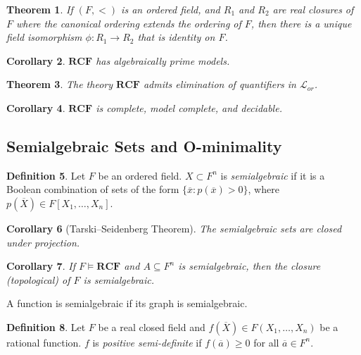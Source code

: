 \documentclass{amsart}
\newtheorem{theorem}{Theorem}[subsection]
\newtheorem{corollary}[theorem]{Corollary}
\theoremstyle{definition}
\newtheorem{definition}[theorem]{Definition}
\numberwithin{equation}{section}
\begin{document}
\begin{theorem}
    If $(F,<)$ is an ordered field,
    and $R_1$ and $R_2$ are real closures of $F$ where the canonical ordering extends the ordering of $F$,
    then there is a unique field isomorphism $\phi: R_1 \to R_2$ that is identity on $F$.
\end{theorem}

\begin{corollary}
    $\mathbf{RCF}$ has algebraically prime models.
\end{corollary}

\begin{theorem}
    The theory $\mathbf{RCF}$ admits elimination of quantifiers in $\mathcal{L}_{or}$.
\end{theorem}

\begin{corollary}
    $\mathbf{RCF}$ is complete, model complete, and decidable.
\end{corollary}

\subsection{Semialgebraic Sets and O-minimality}
\begin{definition}
    Let $F$ be an ordered field.
    $X \subset F^n$ is \emph{semialgebraic} if it is a Boolean combination of sets of the form $\{\overline{x}:p(\overline{x})>0\}$,
    where $p(\overline{X}) \in F[X_1,\dots,X_n]$.
\end{definition}

\begin{corollary}[Tarski--Seidenberg Theorem]
    The semialgebraic sets are closed under projection.
\end{corollary}

\begin{corollary}
    If $F \models \mathbf{RCF}$ and $A \subseteq F^n$ is semialgebraic,
    then the closure (topological) of $F$ is semialgebraic.
\end{corollary}

A function is semialgebraic if its graph is semialgebraic.

\begin{definition}
    Let $F$ be a real closed field and
    $f(\overline{X}) \in F(X_1,\dots,X_n)$ be a rational function.
    $f$ is \emph{positive semi-definite} if $f(\overline{a}) \ge 0$ for all $\overline{a} \in F^n$.
\end{definition}
\end{document}
